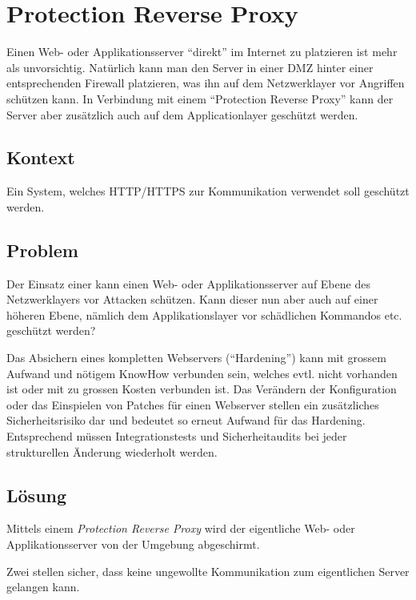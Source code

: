 \section{Protection Reverse Proxy}
\label{sec:proteciton-reverse-proxy}

Einen Web- oder Applikationsserver ``direkt'' im Internet zu platzieren ist mehr als unvorsichtig. Natürlich kann man den Server in einer DMZ hinter einer entsprechenden Firewall platzieren, was ihn auf dem Netzwerklayer vor Angriffen schützen kann. In Verbindung mit einem ``Protection Reverse Proxy'' kann der Server aber zusätzlich auch auf dem Applicationlayer geschützt werden.

\subsection*{Kontext}
Ein System, welches HTTP/HTTPS zur Kommunikation verwendet soll geschützt werden.

\subsection*{Problem}
Der Einsatz einer  kann einen Web- oder Applikationsserver auf Ebene des Netzwerklayers vor Attacken schützen. Kann dieser nun aber auch auf einer höheren Ebene, nämlich dem Applikationslayer vor schädlichen Kommandos etc. geschützt werden?

Das Absichern eines kompletten Webservers (``\gls{Hardening}'') kann mit grossem Aufwand und nötigem KnowHow verbunden sein, welches evtl. nicht vorhanden ist oder mit zu grossen Kosten verbunden ist.
Das Verändern der Konfiguration oder das Einspielen von Patches für einen Webserver stellen ein zusätzliches Sicherheitsrisiko dar und bedeutet so erneut Aufwand für das Hardening. Entsprechend müssen Integrationstests und Sicherheitaudits bei jeder strukturellen Änderung wiederholt werden.

\subsection*{Lösung}
Mittels einem \emph{Protection Reverse Proxy} wird der eigentliche Web- oder Applikationsserver von der Umgebung abgeschirmt.

Zwei  stellen sicher, dass keine ungewollte Kommunikation zum eigentlichen Server gelangen kann.

